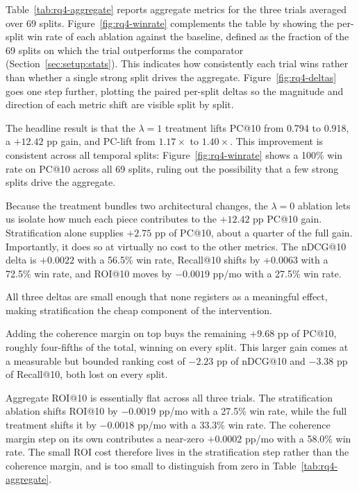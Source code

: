 Table~\ref{tab:rq4-aggregate} reports aggregate metrics for the three trials averaged over 69 splits. Figure~\ref{fig:rq4-winrate} complements the table by showing the per-split win rate of each ablation against the baseline, defined as the fraction of the 69 splits on which the trial outperforms the comparator (Section~\ref{sec:setup:stats}). This indicates how consistently each trial wins rather than whether a single strong split drives the aggregate. Figure~\ref{fig:rq4-deltas} goes one step further, plotting the paired per-split deltas so the magnitude and direction of each metric shift are visible split by split.

The headline result is that the $\lambda = 1$ treatment lifts PC@10 from 0.794 to 0.918, a $+12.42$ pp gain, and PC-lift from $1.17\times$ to $1.40\times$. This improvement is consistent across all temporal splits: Figure~\ref{fig:rq4-winrate} shows a 100\% win rate on PC@10 across all 69 splits, ruling out the possibility that a few strong splits drive the aggregate.

Because the treatment bundles two architectural changes, the $\lambda = 0$ ablation lets us isolate how much each piece contributes to the $+12.42$ pp PC@10 gain. Stratification alone supplies $+2.75$ pp of PC@10, about a quarter of the full gain. Importantly, it does so at virtually no cost to the other metrics. The nDCG@10 delta is $+0.0022$ with a 56.5\% win rate, Recall@10 shifts by $+0.0063$ with a 72.5\% win rate, and ROI@10 moves by $-0.0019$ pp/mo with a 27.5\% win rate.

All three deltas are small enough that none registers as a meaningful effect, making stratification the cheap component of the intervention.

Adding the coherence margin on top buys the remaining $+9.68$ pp of PC@10, roughly four-fifths of the total, winning on every split. This larger gain comes at a measurable but bounded ranking cost of $-2.23$ pp of nDCG@10 and $-3.38$ pp of Recall@10, both lost on every split.

Aggregate ROI@10 is essentially flat across all three trials. The stratification ablation shifts ROI@10 by $-0.0019$ pp/mo with a 27.5\% win rate, while the full treatment shifts it by $-0.0018$ pp/mo with a 33.3\% win rate. The coherence margin step on its own contributes a near-zero $+0.0002$ pp/mo with a 58.0\% win rate. The small ROI cost therefore lives in the stratification step rather than the coherence margin, and is too small to distinguish from zero in Table~\ref{tab:rq4-aggregate}.

